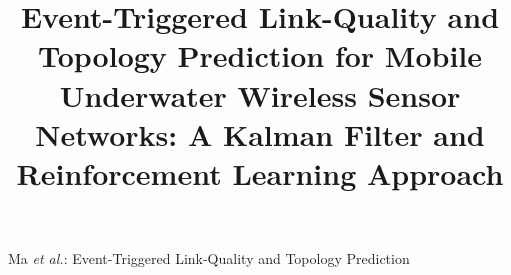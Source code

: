 \documentclass[journal]{IEEEtran}
\begin{document}
\title{Event-Triggered Link-Quality and Topology Prediction for Mobile
Underwater Wireless Sensor Networks: A Kalman Filter and
Reinforcement Learning Approach}



%
{Ma \MakeLowercase{\textit{et al.}}: Event-Triggered Link-Quality and Topology Prediction}

\maketitle












\end{document}
